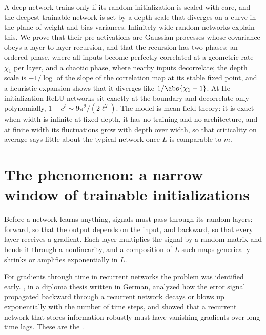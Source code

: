 \newcommand{\signalpropV}{\mathcal{V}}
\newcommand{\signalpropC}{\mathcal{C}}
\newcommand{\signalpropG}{\widehat{G}}

\begin{refsection}

\begin{chaptersummary}
A deep network trains only if its random initialization is scaled with care, and the deepest trainable network is set by a depth scale that diverges on a curve in the plane of weight and bias variances. Infinitely wide random networks explain this. We prove that their pre-activations are Gaussian processes whose covariance obeys a layer-to-layer recursion, and that the recursion has two phases: an ordered phase, where all inputs become perfectly correlated at a geometric rate $\chi_1$ per layer, and a chaotic phase, where nearby inputs decorrelate; the depth scale is $-1/\log$ of the slope of the correlation map at its stable fixed point, and a heuristic expansion shows that it diverges like $1/\abs{\chi_1-1}$. At He initialization ReLU networks sit exactly at the boundary and decorrelate only polynomially, $1-c^\ell\sim 9\pi^2/(2\ell^2)$. The model is mean-field theory: it is exact when width is infinite at fixed depth, it has no training and no architecture, and at finite width its fluctuations grow with depth over width, so that criticality on average says little about the typical network once $L$ is comparable to $m$.
\end{chaptersummary}

\section{The phenomenon: a narrow window of trainable initializations}\label{sec:signalprop:phenomenon}

Before a network learns anything, signals must pass through its random layers: forward, so that the output depends on the input, and backward, so that every layer receives a gradient. Each layer multiplies the signal by a random matrix and bends it through a nonlinearity, and a composition of $L$ such maps generically shrinks or amplifies exponentially in $L$.

For gradients through time in recurrent networks the problem was identified early. \Textcite{Hochreiter1991}, in a diploma thesis written in German, analyzed how the error signal propagated backward through a recurrent network decays or blows up exponentially with the number of time steps, and \textcite{BengioEtAl1994} showed that a recurrent network that stores information robustly must have vanishing gradients over long time lags. These are the .


\end{refsection}
